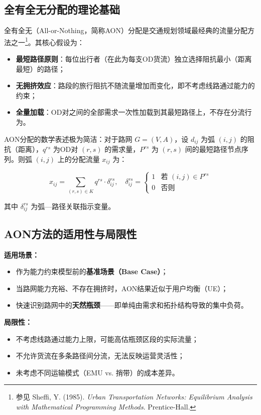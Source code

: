 \documentclass[12pt,a4paper,fontset=none]{ctexart}
\begin{document}
\subsection{全有全无分配的理论基础}

全有全无（All-or-Nothing，简称AON）分配是交通规划领域最经典的流量分配方法之一\footnote{参见 Sheffi, Y. (1985). \textit{Urban Transportation Networks: Equilibrium Analysis with Mathematical Programming Methods}. Prentice-Hall.}。其核心假设为：

\begin{itemize}
    \item \textbf{最短路径原则}：每位出行者（在此为每支OD货流）独立选择阻抗最小（距离最短）的路径；
    \item \textbf{无拥挤效应}：路段的旅行阻抗不随流量增加而变化，即不考虑线路通过能力的约束；
    \item \textbf{全量加载}：OD对之间的全部需求一次性加载到其最短路径上，不存在分流行为。
\end{itemize}

AON分配的数学表述极为简洁：对于路网 $G=(V,A)$，设 $d_{ij}$ 为弧 $(i,j)$ 的阻抗（距离），$q^{rs}$ 为OD对 $(r,s)$ 的需求量，$P^{rs}$ 为 $(r,s)$ 间的最短路径节点序列。则弧 $(i,j)$ 上的分配流量 $x_{ij}$ 为：

\begin{equation}
x_{ij} = \sum_{(r,s) \in K} q^{rs} \cdot \delta_{ij}^{rs}, \quad 
\delta_{ij}^{rs} = 
\begin{cases}
1 & \text{若 } (i,j) \in P^{rs} \\
0 & \text{否则}
\end{cases}
\end{equation}

其中 $\delta_{ij}^{rs}$ 为弧—路径关联指示变量。

\subsection{AON方法的适用性与局限性}

\textbf{适用场景：}
\begin{itemize}
    \item 作为能力约束模型前的\textbf{基准场景（Base Case）}；
    \item 当路网能力充裕、不存在拥挤时，AON结果近似于用户均衡（UE）；
    \item 快速识别路网中的\textbf{天然瓶颈}——即单纯由需求和拓扑结构导致的集中负荷。
\end{itemize}

\textbf{局限性：}
\begin{itemize}
    \item 不考虑线路通过能力上限，可能高估瓶颈区段的实际流量；
    \item 不允许货流在多条路径间分流，无法反映运营灵活性；
    \item 未考虑不同运输模式（EMU vs. 捎带）的成本差异。
\end{itemize}
\end{document}
